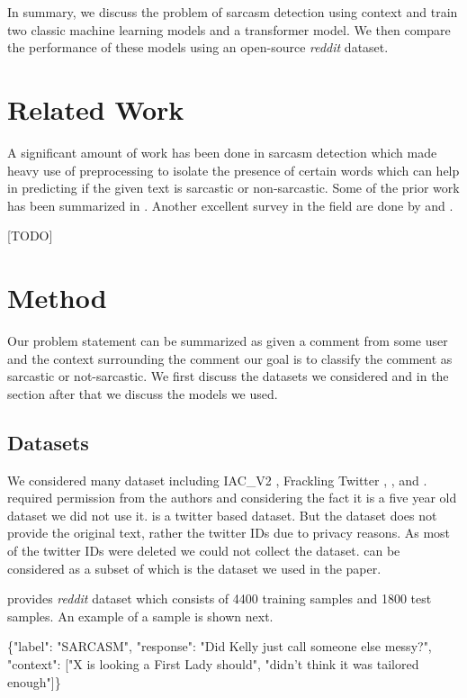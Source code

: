 \documentclass[10pt,twocolumn,letterpaper]{article}
\begin{document}
In summary, we discuss the problem of sarcasm detection using context and train two classic machine learning models and a transformer model. We then compare the performance of these models using an open-source \textit{reddit} dataset.    

\section{Related Work}

A significant amount of work has been done in sarcasm detection which made heavy use of preprocessing to isolate the presence of certain words which can help in predicting if the given text is sarcastic or non-sarcastic. Some of the prior work has been summarized in \cite{paper_06}. Another excellent survey in the field are done by \cite{paper_07} and \cite{paper_08}.

[TODO]

\section{Method}
Our problem statement can be summarized as given a comment from some user and the context surrounding the comment our goal is to classify the comment as sarcastic or not-sarcastic. We first discuss the datasets we considered and in the section after that we discuss the models we used.

\subsection{Datasets}
We considered many dataset including IAC\_V2 \cite{paper_09}, Frackling Twitter \cite{paper_10}, \cite{paper_11}, \cite{paper_12} and \cite{paper_06}. \cite{paper_09} required permission from the authors and considering the fact it is a five year old dataset we did not use it. \cite{paper_10} is a twitter based dataset. But the dataset does not provide the original text, rather the twitter IDs due to privacy reasons. As most of the twitter IDs were deleted we could not collect the dataset. \cite{paper_11} can be considered as a subset of \cite{paper_06} which is the dataset we used in the paper.

\cite{paper_06} provides \textit{reddit} dataset which consists of 4400 training samples and 1800 test samples. An example of a sample is shown next.

\{"label": "SARCASM", "response": "Did Kelly just call someone else messy?", "context": ["X is looking a First Lady should", "didn't think it was tailored enough"]\}
\end{document}
